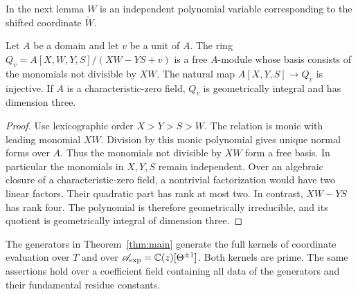 In the next lemma $W$ is an independent polynomial variable corresponding
to the shifted coordinate $\widetilde W$.
\begin{lemma}\label{lem:quadric}
Let $A$ be a domain and let $v$ be a unit of $A$.
The ring $Q_v=A[X,W,Y,S]/(XW-YS+v)$ is a free $A$-module whose
basis consists of the monomials not divisible by $XW$.
The natural map $A[X,Y,S]\to Q_v$ is injective.
If $A$ is a characteristic-zero field, $Q_v$ is geometrically integral
and has dimension three.
\end{lemma}
\begin{proof}
Use lexicographic order $X>Y>S>W$. The relation is monic with leading
monomial $XW$. Division by this monic polynomial gives unique normal forms over $A$. Thus the monomials not divisible by $XW$ form a free basis.
In particular the monomials in $X,Y,S$ remain independent.
Over an algebraic closure of a characteristic-zero field, a nontrivial
factorization would have two linear factors. Their quadratic part has
rank at most two. In contrast, $XW-YS$ has rank four.
The polynomial is therefore geometrically irreducible, and its quotient
is geometrically integral of dimension three.
\end{proof}
\begin{lemma}\label{lem:ideal}
The generators in Theorem~\ref{thm:main} generate the full kernels of
coordinate evaluation over $T$ and over
$\mathscr A_{\exp}=\mathbb{C}(z)[\Theta^{\pm1}]$. Both kernels are prime.
The same assertions hold over a coefficient field containing all data
of the generators and their fundamental residue constants.
\end{lemma}

